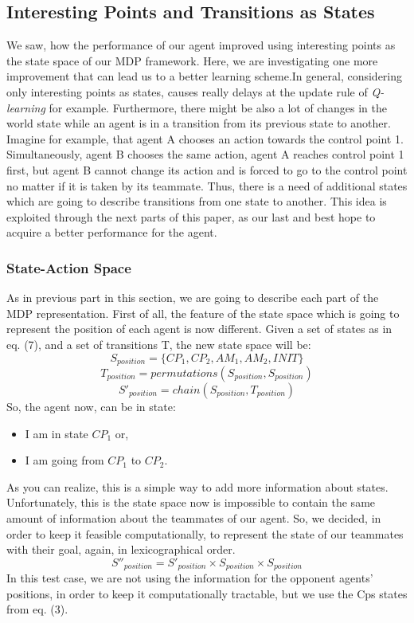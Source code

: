 \documentclass[conference]{IEEEtran}
\begin{document}
\subsection{Interesting Points and Transitions as States}
We saw, how the performance of our agent improved using interesting points as the state space of our MDP framework. Here, we are investigating one more improvement that can lead us to a better learning scheme.In general, considering only interesting points as states, causes really delays at the update rule of \textit{Q-learning} for example. Furthermore, there might be also a lot of changes in the world state while an agent is in a transition from its previous state to another. Imagine for example, that agent A chooses an action towards the control point 1. Simultaneously, agent B chooses the same action, agent A reaches control point 1 first, but agent B cannot change its action and is forced to go to the control point no matter if it is taken by its teammate. Thus, there is a need of additional states which are going to describe transitions from one state to another. This idea is exploited through the next parts of this paper, as our last and best hope to acquire a better performance for the agent.
\subsubsection{State-Action Space}
As in previous part in this section, we are going to describe each part of the MDP representation. First of all, the feature of the state space which is going to represent the position of each agent is now different. Given a set of states as in eq. (7), and a set of transitions T, the new state space will be:
\begin{equation}
S_{position} = \lbrace CP_1, CP_2, AM_1, AM_2, INIT  \rbrace
\end{equation}
\begin{equation}
T_{position} = permutations(S_{position}, S_{position})
\end{equation}
\begin{equation}
S'_{position} = chain(S_{position}, T_{position})
\end{equation}
So, the agent now, can be in state:
\begin{itemize}
\item I am in state $CP_1$ or,
\item I am going from $CP_1$ to $CP_2$.
\end{itemize}
As you can realize, this is a simple way to add more information about states. Unfortunately, this is the state space now is impossible to contain the same amount of information about the teammates of our agent. So, we decided, in order to keep it feasible computationally, to represent the state of our teammates with their goal, again, in lexicographical order.
\begin{equation}
S''_{position} = S'_{position} \times S_{position} \times S_{position} 
\end{equation}
In this test case, we are not using the information for the opponent agents' positions, in order to keep it computationally tractable, but we use the Cps states from eq. (3).
\end{document}
